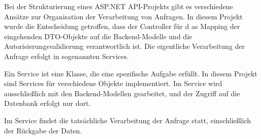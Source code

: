 \noindent Bei der Strukturierung eines ASP.NET API-Projekts gibt es verschiedene Ansätze zur Organisation der 
Verarbeitung von Anfragen. In diesem Projekt wurde die Entscheidung getroffen, dass der Controller für d
as Mapping der eingehenden DTO-Objekte auf die Backend-Modelle und die Autorisierungsvalidierung 
verantwortlich ist. Die eigentliche Verarbeitung der Anfrage erfolgt in sogenannten Services.

\noindent Ein Service ist eine Klasse, die eine spezifische Aufgabe erfüllt. In diesem Projekt sind 
Services für verschiedene Objekte implementiert. Im Service wird ausschließlich mit den Backend-Modellen 
gearbeitet, und der Zugriff auf die Datenbank erfolgt nur dort.

\noindent Im Service findet die tatsächliche Verarbeitung der Anfrage statt, einschließlich der Rückgabe der Daten.
